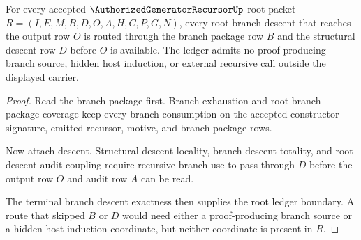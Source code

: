\begin{theorem}
\label{thm:authorized-generator-recursor-root-branch-descent-ledger}
For every accepted $\AuthorizedGeneratorRecursorUp$ root packet $R=(I,E,M,B,D,O,A,H,C,P,G,N)$, every root branch descent that reaches the output row $O$ is routed through the branch package row $B$ and the structural descent row $D$ before $O$ is available. The ledger admits no proof-producing branch source, hidden host induction, or external recursive call outside the displayed carrier.
\end{theorem}
\begin{proof}
Read the branch package first. Branch exhaustion and root branch package coverage keep every branch consumption on the accepted constructor signature, emitted recursor, motive, and branch package rows.

Now attach descent. Structural descent locality, branch descent totality, and root descent-audit coupling require recursive branch use to pass through $D$ before the output row $O$ and audit row $A$ can be read.

The terminal branch descent exactness then supplies the root ledger boundary. A route that skipped $B$ or $D$ would need either a proof-producing branch source or a hidden host induction coordinate, but neither coordinate is present in $R$.
\end{proof}

